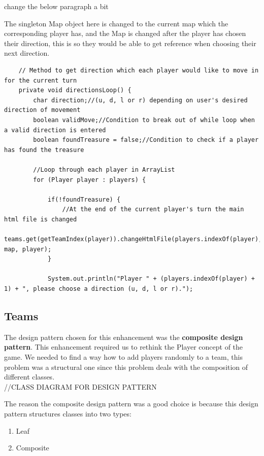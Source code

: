 \documentclass[a4paper,12pt]{extarticle}
\begin{document}
change the below paragraph a bit

The singleton Map object here is changed to the current map which the corresponding player has, and the Map is changed after the player has chosen their direction, this is so they would be able to get reference when choosing their next direction.\\

\begin{lstlisting}
    // Method to get direction which each player would like to move in for the current turn
    private void directionsLoop() {
        char direction;//(u, d, l or r) depending on user's desired direction of movement
        boolean validMove;//Condition to break out of while loop when a valid direction is entered
        boolean foundTreasure = false;//Condition to check if a player has found the treasure

        //Loop through each player in ArrayList
        for (Player player : players) {

            if(!foundTreasure) {
                //At the end of the current player's turn the main html file is changed
                teams.get(getTeamIndex(player)).changeHtmlFile(players.indexOf(player), map, player);
            }

            System.out.println("Player " + (players.indexOf(player) + 1) + ", please choose a direction (u, d, l or r).");
\end{lstlisting}

\subsection{Teams}
The design pattern chosen for this enhancement was the \textbf{composite design pattern}. This enhancement required us to rethink the Player concept of the game. We needed to find a way how to add players randomly to a team, this problem was a structural one since this problem deals with the composition of different classes.\\

//CLASS DIAGRAM FOR DESIGN PATTERN


\noindent The reason the composite design pattern was a good choice is because this design pattern structures classes into two types:\\

\begin{enumerate}
\item Leaf
\item Composite
\end{enumerate}
\end{document}
